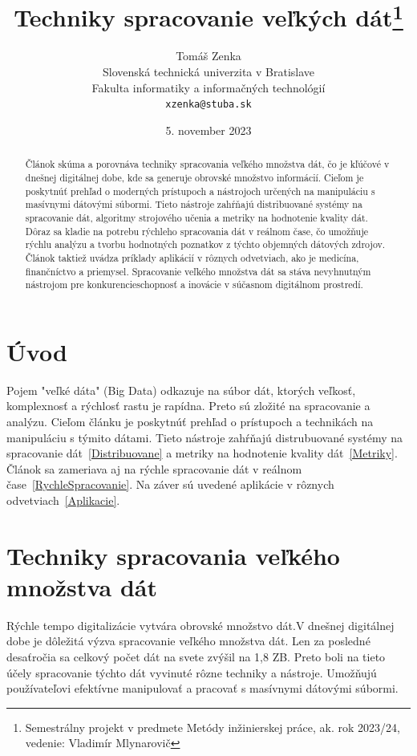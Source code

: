 \documentclass[10pt,twoside,slovak,a4paper]{article}
\title{Techniky spracovanie veľkých dát\thanks{Semestrálny projekt v predmete Metódy inžinierskej práce, ak. rok 2023/24, vedenie: Vladimír Mlynarovič}} %
\author{Tomáš Zenka\\[2pt]
	{\small Slovenská technická univerzita v Bratislave}\\
	{\small Fakulta informatiky a informačných technológií}\\
	{\small \texttt{xzenka@stuba.sk}}
	}
\date{\small 5. november 2023} %
\begin{document}
\maketitle

\begin{abstract}
Článok skúma a porovnáva techniky spracovania veľkého množstva dát, čo je kľúčové v dnešnej digitálnej dobe, kde sa generuje obrovské množstvo informácií. Cieľom je poskytnúť prehľad o moderných prístupoch a nástrojoch určených na manipuláciu s masívnymi dátovými súbormi. Tieto nástroje zahŕňajú distribuované systémy na spracovanie dát, algoritmy strojového učenia a metriky na hodnotenie kvality dát. Dôraz sa kladie na potrebu rýchleho spracovania dát v reálnom čase, čo umožňuje rýchlu analýzu a tvorbu hodnotných poznatkov z týchto objemných dátových zdrojov. Článok taktiež uvádza príklady aplikácií v rôznych odvetviach, ako je medicína, finančníctvo a priemysel. Spracovanie veľkého množstva dát sa stáva nevyhnutným nástrojom pre konkurencieschopnosť a inovácie v súčasnom digitálnom prostredí.
\end{abstract}



\section{Úvod}

Pojem "veľké dáta" (Big Data) odkazuje na súbor dát, ktorých veľkosť, komplexnosť a rýchlosť rastu je rapídna. Preto sú zložité na spracovanie a analýzu.\cite{ZakladneInfo} Cieľom článku je poskytnúť prehľad o prístupoch a technikách na manipuláciu s týmito dátami. Tieto nástroje zahŕňajú distrubuované systémy na spracovanie dát~\ref{Distribuovane}  a metriky na hodnotenie kvality dát~\ref{Metriky}. Článok sa zameriava aj na rýchle spracovanie dát v reálnom čase~\ref{RychleSpracovanie}. Na záver sú uvedené aplikácie v rôznych odvetviach~\ref{Aplikacie}.



\section{Techniky spracovania veľkého množstva dát} \label{Techniky}

Rýchle tempo digitalizácie vytvára obrovské množstvo dát.V dnešnej digitálnej dobe je dôležitá výzva spracovanie veľkého množstva dát. Len za posledné desaťročia sa celkový počet dát na svete zvýšil na 1,8 ZB\cite{Survey}. Preto boli na tieto účely spracovanie týchto dát vyvinuté rôzne techniky a nástroje. Umožňujú používateľovi efektívne manipulovať a pracovať s masívnymi dátovými súbormi.
\end{document}
